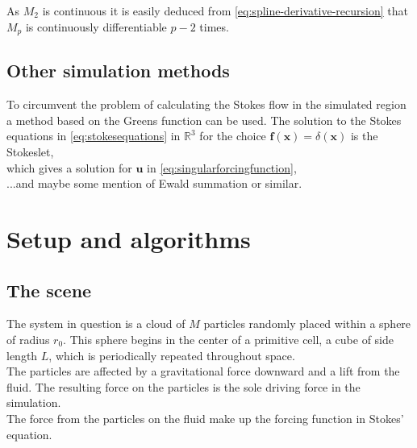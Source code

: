 \documentclass[a4paper,
twoside=false,abstract=false,numbers=noenddot,
titlepage=false,headings=small,parskip=half,version=last]{scrartcl}
\begin{document}
As $M_2$ is continuous it is easily deduced from \eqref{eq:spline-derivative-recursion} that $M_p$ is continuously differentiable $p-2$ times.

\subsection{Other simulation methods}
To circumvent the problem of calculating the Stokes flow in the simulated region a method based on the Greens function can be used.
The solution to the Stokes equations in \eqref{eq:stokesequations} in $\mathbb{R}^3$ for the choice $\mathbf{f}(\mathbf{x}) = \delta(\mathbf{x})$ is the Stokeslet,
\begin{equation}
[Stokeslet]
\end{equation}
which gives a solution for $\mathbf{u}$ in \eqref{eq:singularforcingfunction},
\begin{equation}
[Solutionsum]
\end{equation}
...and maybe some mention of Ewald summation or similar.

\section{Setup and algorithms}

\subsection{The scene}
The system in question is a cloud of $M$ particles randomly placed within a sphere of radius $r_0$. This sphere begins in the center of a primitive cell, a cube of side length $L$, which is periodically repeated throughout space.\\
The particles are affected by a gravitational force downward and a lift from the fluid. The resulting force on the particles is the sole driving force in the simulation.\\
The force from the particles on the fluid make up the forcing function in Stokes' equation.
\end{document}
